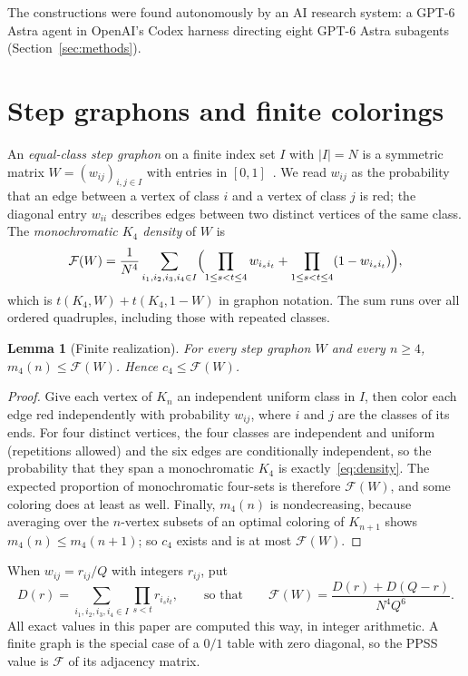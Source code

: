 \documentclass[11pt]{article}
\newtheorem{lemma}[theorem]{Lemma}
\theoremstyle{definition}
\theoremstyle{remark}
\newcommand{\F}{\mathcal F}
\begin{document}
The constructions were found autonomously by an AI research system: a GPT-6 Astra agent in OpenAI's Codex harness directing eight GPT-6 Astra subagents (Section~\ref{sec:methods}).

\section{Step graphons and finite colorings}
\label{sec:prelim}

An \emph{equal-class step graphon} on a finite index set $I$ with $|I|=N$ is a symmetric matrix $W=(w_{ij})_{i,j\in I}$ with entries in $[0,1]$~\cite{lovaszszegedy2006}.
We read $w_{ij}$ as the probability that an edge between a vertex of class $i$ and a vertex of class $j$ is red; the diagonal entry $w_{ii}$ describes edges between two distinct vertices of the same class.
The \emph{monochromatic $K_4$ density} of $W$ is
\begin{equation}
\label{eq:density}
 \F(W)=\frac1{N^4}\sum_{i_1,i_2,i_3,i_4\in I}
 \Bigl(\prod_{1\le s<t\le4}w_{i_si_t}+\prod_{1\le s<t\le4}(1-w_{i_si_t})\Bigr),
\end{equation}
which is $t(K_4,W)+t(K_4,1-W)$ in graphon notation.
The sum runs over all ordered quadruples, including those with repeated classes.

\begin{lemma}[Finite realization]
\label{lem:realization}
For every step graphon $W$ and every $n\ge4$, $m_4(n)\le\F(W)$.
Hence $c_4\le\F(W)$.
\end{lemma}
\begin{proof}
Give each vertex of $K_n$ an independent uniform class in $I$, then color each edge red independently with probability $w_{ij}$, where $i$ and $j$ are the classes of its ends.
For four distinct vertices, the four classes are independent and uniform (repetitions allowed) and the six edges are conditionally independent, so the probability that they span a monochromatic $K_4$ is exactly~\eqref{eq:density}.
The expected proportion of monochromatic four-sets is therefore $\F(W)$, and some coloring does at least as well.
Finally, $m_4(n)$ is nondecreasing, because averaging over the $n$-vertex subsets of an optimal coloring of $K_{n+1}$ shows $m_4(n)\le m_4(n+1)$; so $c_4$ exists and is at most $\F(W)$.
\end{proof}

When $w_{ij}=r_{ij}/Q$ with integers $r_{ij}$, put
\begin{equation}
\label{eq:integer}
 D(r)=\sum_{i_1,i_2,i_3,i_4\in I}\prod_{s<t}r_{i_si_t},
 \qquad\text{so that}\qquad
 \F(W)=\frac{D(r)+D(Q-r)}{N^4Q^6}.
\end{equation}
All exact values in this paper are computed this way, in integer arithmetic.
A finite graph is the special case of a $0/1$ table with zero diagonal, so the PPSS value is $\F$ of its adjacency matrix.
\end{document}
